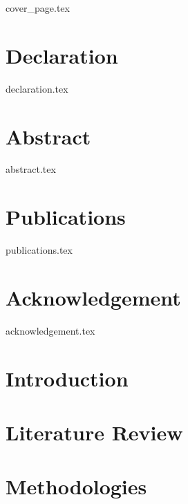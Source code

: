 \documentclass[a4paper, 12pt, oneside]{book}
\begin{document}
\frontmatter
{cover_page.tex}


\chapter*{Declaration}
{declaration.tex}

\chapter*{Abstract}
{abstract.tex}

\chapter*{Publications}
{publications.tex}

\chapter*{Acknowledgement}
{acknowledgement.tex}

{  %

\tableofcontents

\listoffigures

{\let\clearpage\relax
\listoftables}

\printglossary[type=\acronymtype,nonumberlist, style=super
]
}

\mainmatter


\chapter{Introduction}

\chapter{Literature Review}

\chapter{Methodologies}
\end{document}
